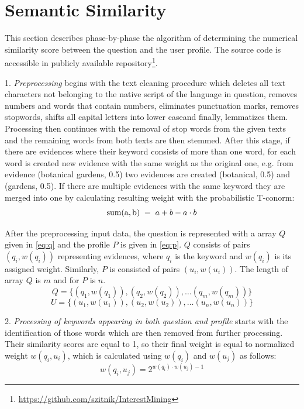 \documentclass[conference]{IEEEtran}
\begin{document}
\section{Semantic Similarity}
\label{sec:alg}
This section describes phase-by-phase the algorithm of determining the numerical similarity score between the question and the user profile. The source code is accessible in publicly available repository\footnote{\url{https://github.com/szitnik/InterestMining}}.
	
1. {\it Preprocessing} begins with the text cleaning procedure which deletes all text characters not belonging to the native script of the language in question, removes numbers and words that contain numbers, eliminates punctuation marks, removes stopwords, shifts all capital letters into lower caseand finally, lemmatizes them. Processing then continues with the removal of stop words from the given texts and the remaining words from both texts are then stemmed. After this stage, if there are evidences where their keyword consists of more than one word, for each word is created new evidence with the same weight as the original one, e.g. from evidence (botanical gardens, 0.5) two evidences are created (botanical, 0.5) and (gardens, 0.5). If there are multiple evidences with the same keyword they are merged into one by calculating resulting weight with the probabilistic T-conorm: 
\begin{equation}
	\label{eq:tconorm}
	{\rm sum(a,b)}\;=\;a+b-a\cdot b
\end{equation}

After the preprocessing input data, the question is represented with a array $Q$ given in \ref{eq:q} and the profile $P$ is given in \ref{eq:p}. $Q$ consists of pairs $(q_i,w(q_i))$ representing evidences, where $q_i$ is the keyword and $w(q_i)$ is its assigned weight. Similarly, $P$ is consisted of pairs $(u_i,w(u_i))$. The length of array $Q$ is $m$ and for $P$ is $n$.
\begin{equation}
	\label{eq:q}
	Q = \{(q_1,w(q_1)),(q_2,w(q_2)),\ldots(q_m,w(q_m))\}
\end{equation} 
\begin{equation}
	\label{eq:p}
	U=\{(u_1,w(u_1)),(u_2,w(u_2)),\ldots(u_n,w(u_n))\}
\end{equation}

    
2. {\it Processing of keywords appearing in both question and profile} starts with the identification of those words which are then removed from further processing. Their similarity scores are equal to 1, so their final weight is equal to normalized weight $w(q_i,u_i)$, which is calculated using $w(q_i)$ and $w(u_j)$ as follows:
\begin{equation}
	\label{eq:w}
	w(q_i,u_j)=2^{w(q_i)\cdot w(u_j)-1}
\end{equation}
\end{document}
